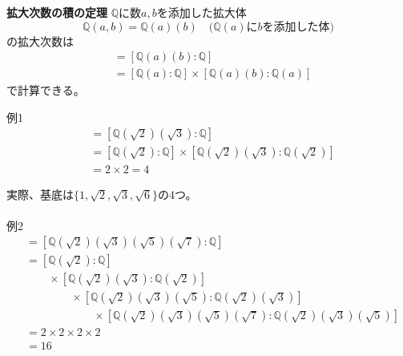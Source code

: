 \begin{itembox}[l]{\bf 拡大次数の積の定理}
$\mathbb{Q}$に数$a,b$を添加した拡大体
$$\mathbb{Q}(a,b) = \mathbb{Q}(a)(b) \quad \text{($\mathbb{Q}(a)$に$b$を添加した体)}$$
の拡大次数は
\begin{align*}
  [\mathbb{Q}(a,b):\mathbb{Q}] &= [\mathbb{Q}(a)(b):\mathbb{Q}]\\
  &= [\mathbb{Q}(a):\mathbb{Q}] \times [\mathbb{Q}(a)(b):\mathbb{Q}(a)]
\end{align*}
で計算できる。
\end{itembox}
{\gt 例1}
\begin{align*}
  [\mathbb{Q}(\sqrt{2},\sqrt{3}):\mathbb{Q}] &= [\mathbb{Q}(\sqrt{2})(\sqrt{3}):\mathbb{Q}]\\
  &= [\mathbb{Q}(\sqrt{2}):\mathbb{Q}] \times [\mathbb{Q}(\sqrt{2})(\sqrt{3}):\mathbb{Q}(\sqrt{2})]\\
  &= 2 \times 2 = 4
\end{align*}\par
実際、基底は$\{ 1,\sqrt{2},\sqrt{3},\sqrt{6} \}$の4つ。\\\\
{\gt 例2}
\begin{align*}
  [\mathbb{Q}(\sqrt{2},\sqrt{3},\sqrt{5},\sqrt{7}):\mathbb{Q}] &= [\mathbb{Q}(\sqrt{2})(\sqrt{3})(\sqrt{5})(\sqrt{7}):\mathbb{Q}]\\
  &= [\mathbb{Q}(\sqrt{2}):\mathbb{Q}] \\
  &\qquad \times [\mathbb{Q}(\sqrt{2})(\sqrt{3}):\mathbb{Q}(\sqrt{2})]\\
  &\qquad\qquad \times [\mathbb{Q}(\sqrt{2})(\sqrt{3})(\sqrt{5}):\mathbb{Q}(\sqrt{2})(\sqrt{3})] \\
  &\qquad\qquad\qquad \times  [\mathbb{Q}(\sqrt{2})(\sqrt{3})(\sqrt{5})(\sqrt{7}):\mathbb{Q}(\sqrt{2})(\sqrt{3})(\sqrt{5})] \\
  &= 2 \times 2 \times 2 \times 2  \\
  &= 16
\end{align*}


